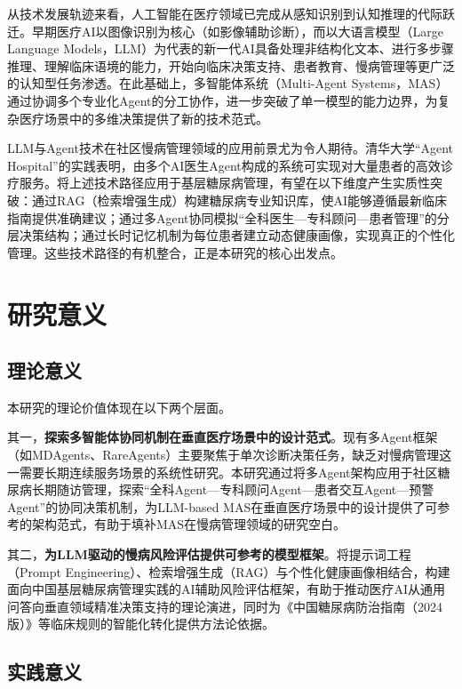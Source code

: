 从技术发展轨迹来看，人工智能在医疗领域已完成从感知识别到认知推理的代际跃迁。早期医疗AI以图像识别为核心（如影像辅助诊断），而以大语言模型（Large Language Models，LLM）为代表的新一代AI具备处理非结构化文本、进行多步骤推理、理解临床语境的能力，开始向临床决策支持、患者教育、慢病管理等更广泛的认知型任务渗透。在此基础上，多智能体系统（Multi-Agent Systems，MAS）通过协调多个专业化Agent的分工协作，进一步突破了单一模型的能力边界，为复杂医疗场景中的多维决策提供了新的技术范式\todocite{}\todocite{}\todocite{}。

LLM与Agent技术在社区慢病管理领域的应用前景尤为令人期待。清华大学``Agent Hospital''的实践表明，由多个AI医生Agent构成的系统可实现对大量患者的高效诊疗服务。将上述技术路径应用于基层糖尿病管理，有望在以下维度产生实质性突破：通过RAG（检索增强生成）构建糖尿病专业知识库，使AI能够遵循最新临床指南提供准确建议；通过多Agent协同模拟``全科医生---专科顾问---患者管理''的分层决策结构；通过长时记忆机制为每位患者建立动态健康画像，实现真正的个性化管理。这些技术路径的有机整合，正是本研究的核心出发点\todocite{}。


\section{研究意义}

\subsection{理论意义}

本研究的理论价值体现在以下两个层面。

其一，\textbf{探索多智能体协同机制在垂直医疗场景中的设计范式}。现有多Agent框架（如MDAgents、RareAgents）主要聚焦于单次诊断决策任务，缺乏对慢病管理这一需要长期连续服务场景的系统性研究。本研究通过将多Agent架构应用于社区糖尿病长期随访管理，探索``全科Agent---专科顾问Agent---患者交互Agent---预警Agent''的协同决策机制，为LLM-based MAS在垂直医疗场景中的设计提供了可参考的架构范式，有助于填补MAS在慢病管理领域的研究空白\todocite{}\todocite{}。

其二，\textbf{为LLM驱动的慢病风险评估提供可参考的模型框架}。将提示词工程（Prompt Engineering）、检索增强生成（RAG）与个性化健康画像相结合，构建面向中国基层糖尿病管理实践的AI辅助风险评估框架，有助于推动医疗AI从通用问答向垂直领域精准决策支持的理论演进，同时为《中国糖尿病防治指南（2024版）》等临床规则的智能化转化提供方法论依据\todocite{}\todocite{}。

\subsection{实践意义}

